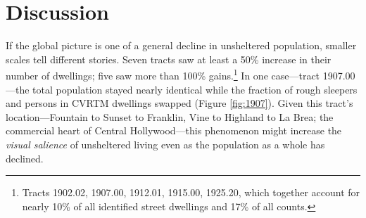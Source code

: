 \documentclass[11pt,twocolumn]{article}
\begin{document}
%

%
%
%

\section{Discussion}
\label{sec:discussion}

If the global picture is one of a general decline in unsheltered population, smaller scales tell different 
stories. Seven tracts saw at least a 50\% increase in their number of dwellings; five saw more than 100\% 
gains.\footnote{Tracts 1902.02, 1907.00, 1912.01, 1915.00, 1925.20, which together account for nearly 
10\% of all identified street dwellings and 17\% of all counts.} 
In one case---tract 1907.00---the total population stayed nearly identical while the fraction of rough sleepers
and persons in CVRTM dwellings swapped (Figure \ref{fig:1907}). Given this tract's location---Fountain
to Sunset to Franklin, Vine to Highland to La Brea; the commercial heart of Central Hollywood---this
phenomenon might increase the {\it visual salience} of unsheltered living even as the population as a 
whole has declined. 
\end{document}
